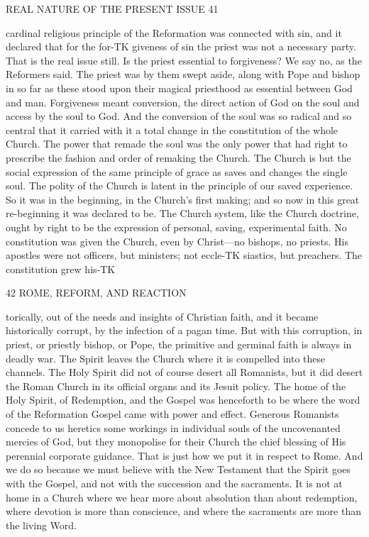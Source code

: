 \documentclass[12pt,a5paper,oneside]{book}
\begin{document}
REAL NATURE OF THE PRESENT ISSUE 41 

cardinal religious principle of the Reformation was 
connected with sin, and it declared that for the for-TK
giveness of sin the priest was not a necessary party. 
That is the real issue still. Is the priest essential to 
forgiveness? We say no, as the Reformers said. 
The priest was by them swept aside, along with 
Pope and bishop in so far as these stood upon their 
magical priesthood as essential between God and man. 
Forgiveness meant conversion, the direct action of God 
on the soul and access by the soul to God. And 
the conversion of the soul was so radical and so 
central that it carried with it a total change in the 
constitution of the whole Church. The power that 
remade the soul was the only power that had right 
to prescribe the fashion and order of remaking the 
Church. The Church is but the social expression 
of the same principle of grace as saves and changes 
the single soul. The polity of the Church is latent 
in the principle of our saved experience. So it was 
in the beginning, in the Church's first making; and 
so now in this great re-beginning it was declared to 
be. The Church system, like the Church doctrine, 
ought by right to be the expression of personal, saving, 
experimental faith. No constitution was given the 
Church, even by Christ---no bishops, no priests. His 
apostles were not officers, but ministers; not eccle-TK
siastics, but preachers. The constitution grew his-TK



42 ROME, REFORM, AND REACTION 

torically, out of the needs and insights of Christian 
faith, and it became historically corrupt, by the infection 
of a pagan time. But with this corruption, in priest, 
or priestly bishop, or Pope, the primitive and germinal 
faith is always in deadly war. The Spirit leaves the 
Church where it is compelled into these channels. 
The Holy Spirit did not of course desert all Romanists, 
but it did desert the Roman Church in its official 
organs and its Jesuit policy. The home of the Holy 
Spirit, of Redemption, and the Gospel was henceforth 
to be where the word of the Reformation Gospel came 
with power and effect. Generous Romanists concede 
to us heretics some workings in individual souls of the 
uncovenanted mercies of God, but they monopolise 
for their Church the chief blessing of His perennial 
corporate guidance. That is just how we put it in 
respect to Rome. And we do so because we must 
believe with the New Testament that the Spirit goes 
with the Gospel, and not with the succession and the 
sacraments. It is not at home in a Church where we 
hear more about absolution than about redemption, 
where devotion is more than conscience, and where 
the sacraments are more than the living Word. 
\end{document}
